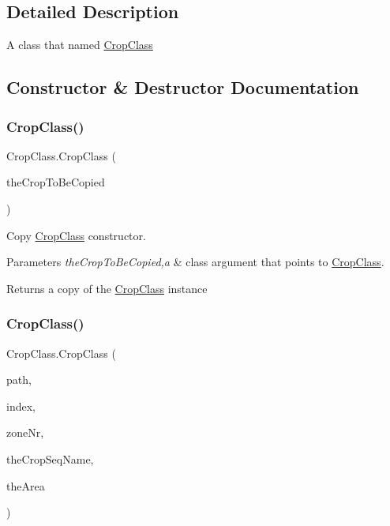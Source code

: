 \subsection{Detailed Description}
A class that named \mbox{\hyperlink{class_crop_class}{Crop\+Class}} 

\subsection{Constructor \& Destructor Documentation}
\mbox{\label{class_crop_class_a8e00519cb09b767e943f60c4255c7474}} 
\subsubsection{\texorpdfstring{CropClass()}{CropClass()}\hspace{0.1cm}{\footnotesize\ttfamily [1/2]}}
{\footnotesize\ttfamily Crop\+Class.\+Crop\+Class (\begin{DoxyParamCaption}\item[{\mbox{\hyperlink{class_crop_class}{Crop\+Class}}}]{the\+Crop\+To\+Be\+Copied }\end{DoxyParamCaption})\hspace{0.3cm}{\ttfamily [inline]}}



Copy \mbox{\hyperlink{class_crop_class}{Crop\+Class}} constructor. 


\begin{DoxyParams}{Parameters}
{\em the\+Crop\+To\+Be\+Copied,a} & class argument that points to \mbox{\hyperlink{class_crop_class}{Crop\+Class}}. \\
\hline
\end{DoxyParams}
\begin{DoxyReturn}{Returns}
a copy of the \mbox{\hyperlink{class_crop_class}{Crop\+Class}} instance 
\end{DoxyReturn}
\mbox{\label{class_crop_class_a1f02ef403977ce1a660de90ec3347d2f}} 
\subsubsection{\texorpdfstring{CropClass()}{CropClass()}\hspace{0.1cm}{\footnotesize\ttfamily [2/2]}}
{\footnotesize\ttfamily Crop\+Class.\+Crop\+Class (\begin{DoxyParamCaption}\item[{string}]{path,  }\item[{int}]{index,  }\item[{int}]{zone\+Nr,  }\item[{string}]{the\+Crop\+Seq\+Name,  }\item[{double}]{the\+Area }\end{DoxyParamCaption})\hspace{0.3cm}{\ttfamily [inline]}}



